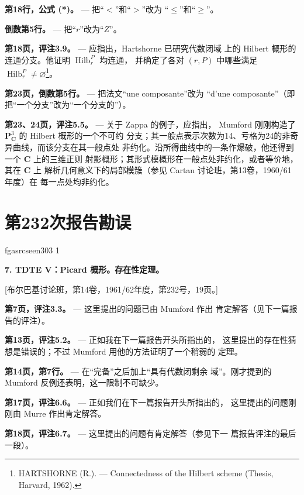 \documentclass[12pt,twoside,openany]{book}
\numberwithin{equation}{section}
\newcommand{\fgaunitid}{unbound}
\newcommand{\src}[1]{%
  \phantomsection
  \hypertarget{src:\fgaunitid:#1}{}%
  \hypertarget{fga.\fgaunitid.p#1}{}%
  \ifcsname fgasrcseen#1\endcsname\else
    \expandafter\gdef\csname fgasrcseen#1\endcsname{1}%
    \hypertarget{src:#1}{}%
  \fi
  \marginpar{\raggedleft\footnotesize\sffamily #1}%
}
\newcommand{\sid}[1]{%
  \gdef\fgaunitid{#1}%
  \phantomsection\hypertarget{fga:#1}{}\hypertarget{fga.#1}{}%
}
\theoremstyle{plain}
\theoremstyle{definition}
\theoremstyle{remark}
\begin{document}
\noindent\textbf{第18行，公式 (*)。} --- 把“$<$”和“$>$”改为
“$\leq$”和“$\geq$”。

\noindent\textbf{倒数第5行。} --- 把“$r$”改为“$Z$”。

\noindent\textbf{第18页，评注3.9。} --- 应指出，Hartshorne 已研究代数闭域
上的 Hilbert 概形的连通分支。他证明 $\operatorname{Hilb}^{P}_{r}$ 均连通，
并确定了各对 $(r,P)$ 中哪些满足
$\operatorname{Hilb}^{P}_{r}\neq\varnothing$\footnote{HARTSHORNE (R.). --- Connectedness of the Hilbert
scheme (Thesis, Harvard, 1962).}。

\noindent\textbf{第23页，倒数第5行。} --- 把法文“une composante”改为
“d'une composante”（即把“一个分支”改为“一个分支的”）。

\noindent\textbf{第23、24页，评注5.5。} --- 关于 Zappa 的例子，应指出，
Mumford 刚刚构造了 $\mathbf P^3_{\mathbf C}$ 的 Hilbert 概形的一个不可约
分支；其一般点表示次数为14、亏格为24的非奇异曲线，而该分支在其一般点处
非约化。沿所得曲线中的一条作爆破，他还得到一个 $\mathbf C$ 上的三维正则
射影概形；其形式模概形在一般点处非约化，或者等价地，其在 $\mathbf C$ 上
解析几何意义下的局部模簇（参见 Cartan 讨论班，第13卷，1960/61年度）在
每一点处均非约化。


\clearpage
\chapter*{第232次报告勘误}
\sid{e232}
\src{303}

\noindent\textbf{7. TDTE V：Picard 概形。存在性定理。}

\begin{center}
[布尔巴基讨论班，第14卷，1961/62年度，第232号，19页。]
\end{center}

\noindent\textbf{第7页，评注3.3。} --- 这里提出的问题已由 Mumford 作出
肯定解答（见下一篇报告的评注）。

\noindent\textbf{第13页，评注5.2。} --- 正如我在下一篇报告开头所指出的，
这里提出的存在性猜想是错误的；不过 Mumford 用他的方法证明了一个稍弱的
定理。

\noindent\textbf{第14页，第7行。} --- 在“完备”之后加上“具有代数闭剩余
域”。刚才提到的 Mumford 反例还表明，这一限制不可缺少。

\noindent\textbf{第17页，评注6.6。} --- 正如我们在下一篇报告开头所指出的，
这里提出的问题刚刚由 Murre 作出肯定解答。

\noindent\textbf{第18页，评注6.7。} --- 这里提出的问题有肯定解答（参见下一
篇报告评注的最后一段）。
\end{document}
